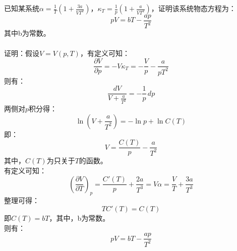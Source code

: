 \documentclass[a4paper,12pt]{article}
\begin{document}
\begin{section}{}
    已知某系统$\alpha=\frac{1}{T}\left(1+\frac{3a}{VT^2}\right)$，$\kappa_T=\frac{1}{p}\left(1+\frac{a}{VT^2}\right)$，证明该系统物态方程为：
    \begin{equation}\nonumber
        pV=bT-\frac{ap}{T^2}
    \end{equation}
    其中b为常数。\\
    \\
    证明：假设$V=V(p,T)$，有定义可知：
    \begin{equation}\nonumber
        \frac{\partial V}{\partial p}=-V\kappa_T=-\frac{V}{p}-\frac{a}{pT^2}
    \end{equation}
    则有：
    \begin{equation}\nonumber
        \frac{dV}{V+\frac{a}{T^2}}=-\frac{1}{p}\,dp
    \end{equation}
    两侧对$p$积分得：
    \begin{equation}\nonumber
        \ln\left(V+\frac{a}{T^2}\right)=-\ln p+\ln C(T)
    \end{equation}
    即：
    \begin{equation}\nonumber
        V=\frac{C(T)}{p}-\frac{a}{T^2}
    \end{equation}
    其中，$C(T)$为只关于$T$的函数。\\
    有定义可知：
    \begin{equation}\nonumber
        \left(\frac{\partial V}{\partial T}\right)_p=\frac{C'(T)}{p}+\frac{2a}{T^3}=V\alpha=\frac{V}{T}+\frac{3a}{T^3}
    \end{equation}
    整理可得：
    \begin{equation}\nonumber
        TC'(T)=C(T)
    \end{equation}
    即$C(T)=bT$，其中，b为常数。\\
    则有：
    \begin{equation}\nonumber
        pV=bT-\frac{ap}{T^2}
    \end{equation}
\end{section}
\end{document}
